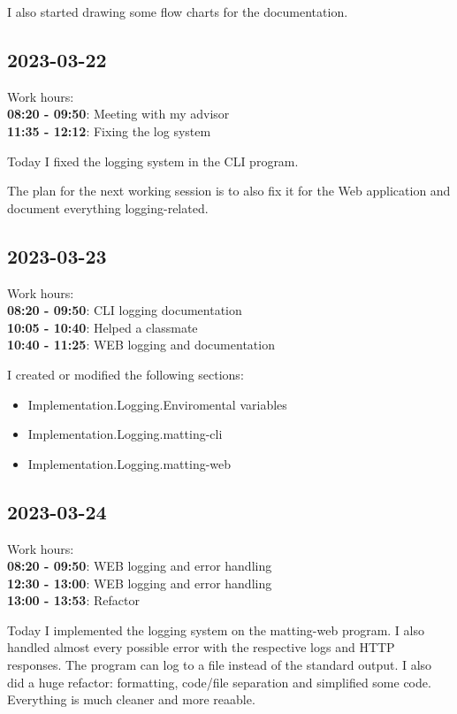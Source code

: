 \documentclass{article}
\begin{document}
I also started drawing some flow charts for the documentation.

\subsection{2023-03-22}

Work hours:\\
\textbf{08:20 - 09:50}: Meeting with my advisor \\
\textbf{11:35 - 12:12}: Fixing the log system

Today I fixed the logging system in the CLI program.

The plan for the next working session is to also fix it for the Web application
and document everything logging-related.

\subsection{2023-03-23}

Work hours:\\
\textbf{08:20 - 09:50}: CLI logging documentation \\
\textbf{10:05 - 10:40}: Helped a classmate \\
\textbf{10:40 - 11:25}: WEB logging and documentation

I created or modified the following sections:
\begin{itemize}
    \item Implementation.Logging.Enviromental variables
    \item Implementation.Logging.matting-cli
    \item Implementation.Logging.matting-web
\end{itemize}

\subsection{2023-03-24}

Work hours:\\
\textbf{08:20 - 09:50}: WEB logging and error handling \\
\textbf{12:30 - 13:00}: WEB logging and error handling \\
\textbf{13:00 - 13:53}: Refactor

Today I implemented the logging system on the matting-web program.
I also handled almost every possible error with the respective logs and HTTP responses.
The program can log to a file instead of the standard output.
I also did a huge refactor: formatting, code/file separation and simplified some code.
Everything is much cleaner and more reaable.
\end{document}
